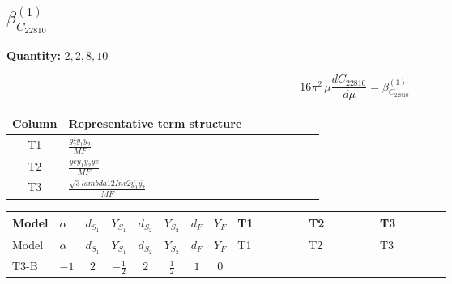 \documentclass[8pt]{article}
\begin{document}
\begin{landscape}
\section*{$\beta_{C_{22810}}^{(1)}$}
\noindent\textbf{Quantity: }$\mathrm{2,2,8,10}$\par\smallskip
\[16\pi^2\,\mu\frac{d C_{22810}}{d\mu}=\beta_{C_{22810}}^{(1)}\]
\begin{center}
\begin{tabular}{@{}c >{\raggedright\arraybackslash}p{0.82\linewidth}@{}}
\toprule
Column & Representative term structure \\
\midrule
T1 & \(\displaystyle \frac{g_{2}^{2} \overline{y_{1}} \overline{y_{2}}}{MF}\) \\
\midrule
T2 & \(\displaystyle \frac{ye \overline{y_{1}} \overline{y_{2}} \overline{ye}}{MF}\) \\
\midrule
T3 & \(\displaystyle \frac{\sqrt{3} lambda12Inv2 \overline{y_{1}} \overline{y_{2}}}{MF}\) \\
\midrule
\bottomrule
\end{tabular}
\end{center}
\smallskip
\tiny
\begin{longtable}{@{}llcccccc >{\raggedright\arraybackslash}p{0.21\linewidth} >{\raggedright\arraybackslash}p{0.21\linewidth} >{\raggedright\arraybackslash}p{0.21\linewidth}@{}}
\toprule
Model & $\alpha$ & $d_{S_1}$ & $Y_{S_1}$ & $d_{S_2}$ & $Y_{S_2}$ & $d_F$ & $Y_F$ & T1 & T2 & T3 \\
\midrule
\endfirsthead
\toprule
Model & $\alpha$ & $d_{S_1}$ & $Y_{S_1}$ & $d_{S_2}$ & $Y_{S_2}$ & $d_F$ & $Y_F$ & T1 & T2 & T3 \\
\midrule
\endhead
T3-B & $-1$ & $2$ & $-\frac{1}{2}$ & $2$ & $\frac{1}{2}$ & $1$ & $0$ & \scriptsize\adjustbox{max width=\linewidth}{$\begin{gathered} \frac{3 g_{2}^{2} \overline{y_{1}} \overline{y_{2}}}{4 MF}\end{gathered}$} & \scriptsize\adjustbox{max width=\linewidth}{$\begin{gathered} - \frac{ye \overline{y_{1}} \overline{y_{2}} \overline{ye}}{4 MF}\end{gathered}$} & \scriptsize\adjustbox{max width=\linewidth}{$\begin{gathered} \frac{\sqrt{3} lambda12Inv2 \overline{y_{1}} \overline{y_{2}}}{3 MF}\end{gathered}$} \\
\midrule
\bottomrule
\end{longtable}
\clearpage

\end{landscape}
\end{document}
